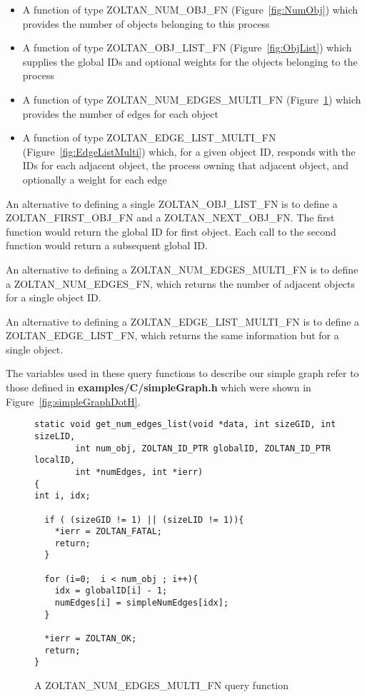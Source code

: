 \begin{itemize}
\item A function of type ZOLTAN\_NUM\_OBJ\_FN (Figure~\ref{fig:NumObj}) which provides the number of objects belonging to this process 
\item A function of type ZOLTAN\_OBJ\_LIST\_FN (Figure~\ref{fig:ObjList}) which supplies the global IDs and optional weights for the objects belonging to the process
\item A function of type ZOLTAN\_NUM\_EDGES\_MULTI\_FN (Figure~\ref{fig:NumEdges}) which provides the number of edges for each object
\item A function of type ZOLTAN\_EDGE\_LIST\_MULTI\_FN (Figure~\ref{fig:EdgeListMulti})
which, for a given object ID, responds with the IDs for
each adjacent object, the process owning that adjacent object, and optionally a weight
for each edge
\end{itemize}

An alternative to defining a single ZOLTAN\_OBJ\_LIST\_FN is to define
a ZOLTAN\_FIRST\_OBJ\_FN and a ZOLTAN\_NEXT\_OBJ\_FN.  The first function
would return the global ID for first object.  Each call to the second function would
return a subsequent global ID.

An alternative to defining a ZOLTAN\_NUM\_EDGES\_MULTI\_FN is to 
define a ZOLTAN\_NUM\_EDGES\_FN, which returns the number of adjacent
objects for a single object ID.

An alternative to defining a ZOLTAN\_EDGE\_LIST\_MULTI\_FN is to 
define a ZOLTAN\_EDGE\_LIST\_FN, which
returns the same information but for a single object.

The variables used in these query functions to describe our simple graph
refer to those defined in \textbf{examples/C/simpleGraph.h} which were shown in
Figure~\ref{fig:simpleGraphDotH}.

\begin{figure}
\begin{flushleft}
\begin{verbatim}
static void get_num_edges_list(void *data, int sizeGID, int sizeLID,
        int num_obj, ZOLTAN_ID_PTR globalID, ZOLTAN_ID_PTR localID,
        int *numEdges, int *ierr)
{
int i, idx;

  if ( (sizeGID != 1) || (sizeLID != 1)){
    *ierr = ZOLTAN_FATAL;
    return;
  }

  for (i=0;  i < num_obj ; i++){
    idx = globalID[i] - 1;
    numEdges[i] = simpleNumEdges[idx];
  }

  *ierr = ZOLTAN_OK;
  return;
}
\end{verbatim}
\end{flushleft}
\caption{A ZOLTAN\_NUM\_EDGES\_MULTI\_FN query function}
\label{fig:NumEdges}
\end{figure}

